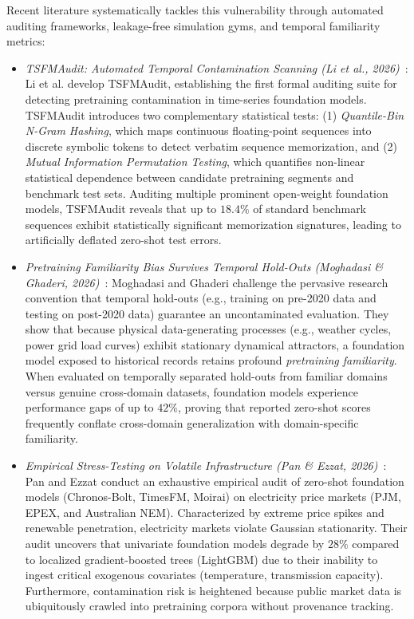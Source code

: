 Recent literature systematically tackles this vulnerability through automated auditing frameworks, leakage-free simulation gyms, and temporal familiarity metrics:
\begin{itemize}[leftmargin=*]
    \item \emph{TSFMAudit: Automated Temporal Contamination Scanning (Li et al., 2026)}~\cite{li2026tsfmaudit}: Li et al. develop TSFMAudit, establishing the first formal auditing suite for detecting pretraining contamination in time-series foundation models. TSFMAudit introduces two complementary statistical tests: (1) \emph{Quantile-Bin N-Gram Hashing}, which maps continuous floating-point sequences into discrete symbolic tokens to detect verbatim sequence memorization, and (2) \emph{Mutual Information Permutation Testing}, which quantifies non-linear statistical dependence between candidate pretraining segments and benchmark test sets. Auditing multiple prominent open-weight foundation models, TSFMAudit reveals that up to $18.4\%$ of standard benchmark sequences exhibit statistically significant memorization signatures, leading to artificially deflated zero-shot test errors.
    \item \emph{Pretraining Familiarity Bias Survives Temporal Hold-Outs (Moghadasi \& Ghaderi, 2026)}~\cite{moghadasi2026familiarity}: Moghadasi and Ghaderi challenge the pervasive research convention that temporal hold-outs (e.g., training on pre-2020 data and testing on post-2020 data) guarantee an uncontaminated evaluation. They show that because physical data-generating processes (e.g., weather cycles, power grid load curves) exhibit stationary dynamical attractors, a foundation model exposed to historical records retains profound \emph{pretraining familiarity}. When evaluated on temporally separated hold-outs from familiar domains versus genuine cross-domain datasets, foundation models experience performance gaps of up to $42\%$, proving that reported zero-shot scores frequently conflate cross-domain generalization with domain-specific familiarity.
    \item \emph{Empirical Stress-Testing on Volatile Infrastructure (Pan \& Ezzat, 2026)}~\cite{pan2026evaluating}: Pan and Ezzat conduct an exhaustive empirical audit of zero-shot foundation models (Chronos-Bolt, TimesFM, Moirai) on electricity price markets (PJM, EPEX, and Australian NEM). Characterized by extreme price spikes and renewable penetration, electricity markets violate Gaussian stationarity. Their audit uncovers that univariate foundation models degrade by $28\%$ compared to localized gradient-boosted trees (LightGBM) due to their inability to ingest critical exogenous covariates (temperature, transmission capacity). Furthermore, contamination risk is heightened because public market data is ubiquitously crawled into pretraining corpora without provenance tracking.

\end{itemize}
